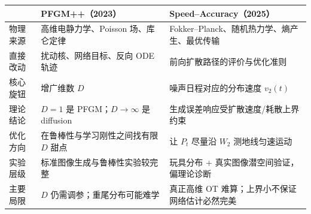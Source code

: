 \documentclass[border=1pt]{standalone}
\begin{document}
\fontsize{8}{9.5}\selectfont
\begin{tabular}{P{1.75cm} P{5.35cm} P{5.35cm}}
\toprule
 & \textbf{PFGM++（2023）} & \textbf{Speed--Accuracy（2025）} \\
\midrule
物理来源 & 高维电静力学、Poisson 场、库仑定律 & Fokker--Planck、随机热力学、熵产生、最优传输 \\
直接改动 & 扰动核、网络目标、反向 ODE 轨迹 & 前向扩散路径的评价与优化准则 \\
核心旋钮 & 增广维数 $D$ & 噪声日程对应的分布速度 $v_2(t)$ \\
理论结论 & $D=1$ 是 PFGM；$D\to\infty$ 是 diffusion & 生成误差响应受扩散速度/耗散上界约束 \\
优化方向 & 在鲁棒性与学习刚性之间找有限 $D$ 甜点 & 让 $P_t$ 尽量沿 $W_2$ 测地线匀速运动 \\
实验层级 & 标准图像生成与鲁棒性实验较完整 & 玩具分布 + 真实图像潜空间验证，偏理论诊断 \\
主要局限 & $D$ 仍需调参；重尾分布可能难学 & 真正高维 OT 难算；上界小不保证网络估计必然完美 \\
\bottomrule
\end{tabular}
\end{document}

